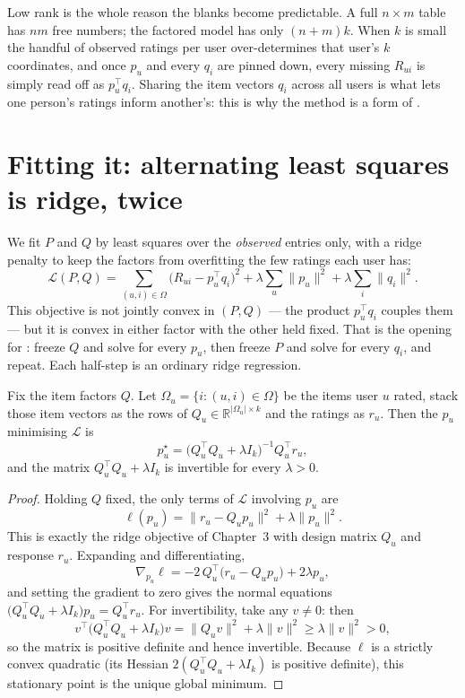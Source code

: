 \documentclass[11pt]{article}
\begin{document}
Low rank is the whole reason the blanks become predictable. A full $n\times m$
table has $nm$ free numbers; the factored model has only $(n+m)k$. When
$k$ is small the handful of observed ratings per user over-determines that
user's $k$ coordinates, and once $p_u$ and every $q_i$ are pinned down, every
missing $R_{ui}$ is simply read off as $p_u^\top q_i$. Sharing the item vectors
$q_i$ across all users is what lets one person's ratings inform another's: this
is why the method is a form of .

\section{Fitting it: alternating least squares is ridge, twice}

We fit $P$ and $Q$ by least squares over the \emph{observed} entries only, with
a ridge penalty to keep the factors from overfitting the few ratings each user
has:
\[
  \mathcal{L}(P,Q)=\sum_{(u,i)\in\Omega}\big(R_{ui}-p_u^\top q_i\big)^2
     +\lambda\sum_u\|p_u\|^2+\lambda\sum_i\|q_i\|^2 .
\]
This objective is not jointly convex in $(P,Q)$ --- the product $p_u^\top q_i$
couples them --- but it is convex in either factor with the other held fixed.
That is the opening for : freeze $Q$ and
solve for every $p_u$, then freeze $P$ and solve for every $q_i$, and repeat.
Each half-step is an ordinary ridge regression.

\begin{theorem}
Fix the item factors $Q$. Let $\Omega_u=\{i:(u,i)\in\Omega\}$ be the items user
$u$ rated, stack those item vectors as the rows of
$Q_u\in\mathbb{R}^{|\Omega_u|\times k}$ and the ratings as $r_u$. Then the
$p_u$ minimising $\mathcal{L}$ is
\[
  p_u^\star=\big(Q_u^\top Q_u+\lambda I_k\big)^{-1}Q_u^\top r_u,
\]
and the matrix $Q_u^\top Q_u+\lambda I_k$ is invertible for every $\lambda>0$.
\end{theorem}
\begin{proof}
Holding $Q$ fixed, the only terms of $\mathcal{L}$ involving $p_u$ are
\[
  \ell(p_u)=\|r_u-Q_u p_u\|^2+\lambda\|p_u\|^2 .
\]
This is exactly the ridge objective of Chapter~3 with design matrix $Q_u$ and
response $r_u$. Expanding and differentiating,
\[
  \nabla_{p_u}\ell = -2\,Q_u^\top\!\big(r_u-Q_u p_u\big)+2\lambda p_u ,
\]
and setting the gradient to zero gives the normal equations
$\big(Q_u^\top Q_u+\lambda I_k\big)p_u=Q_u^\top r_u$. For invertibility, take any
$v\neq 0$: then
\[
  v^\top\!\big(Q_u^\top Q_u+\lambda I_k\big)v=\|Q_u v\|^2+\lambda\|v\|^2
     \ge \lambda\|v\|^2>0 ,
\]
so the matrix is positive definite and hence invertible. Because $\ell$ is a
strictly convex quadratic (its Hessian $2(Q_u^\top Q_u+\lambda I_k)$ is positive
definite), this stationary point is the unique global minimum.
\end{proof}
\end{document}
